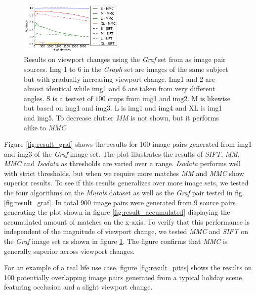 \documentclass[conference]{IEEEtran}
\begin{document}
\begin{figure}
	\centering
	\includegraphics[width=0.45\textwidth]{images/result_viewport}
	\caption{Results on viewport changes using the \emph{Graf} set from 
		\cite{mikolajczyk2005performance} as image pair sources. Img 1 
		to 6 in the \emph{Graph} set are images of the same subject but 
		with gradually increasing viewport change. Img1 and 2 are 
		almost identical while img1 and 6 are taken from very different 
		angles. S is a testset of $100$ crops from img1 and img2. M is 
	likewise but based on img1 and img3.  L is img1 and img4 and XL is 
img1 and img5.  To decrease clutter \emph{MM} is not shown, but it 
performs alike to \emph{MMC}}
	\label{fig:result_viewport}
\end{figure}

Figure \ref{fig:result_graf} shows the results for 100 image pairs 
generated from img1 and img3 of the \emph{Graf} image set. The plot 
illustrates the results of \emph{SIFT}, \emph{MM}, \emph{MMC} and 
\emph{Isodata} as thresholds are varied over a range. \emph{Isodata} 
performs well with strict thresholds, but when we require more matches 
\emph{MM} and \emph{MMC} show superior results. To see if this results 
generalizes over more image sets, we tested the four algorithms on the 
\emph{Murals} dataset as well as the \emph{Graf} pair tested in fig.  
\ref{fig:result_graf}. In total 900 image pairs were generated from 9 
source pairs generating the plot shown in figure 
\ref{fig:result_accumulated} displaying the accumulated amount of 
matches on the x-axis. To verify that this performance is independent of 
the magnitude of viewport change, we tested \emph{MMC} and \emph{SIFT} 
on the \emph{Graf} image set as shown in figure 
\ref{fig:result_viewport}. The figure confirms that \emph{MMC} is 
generally superior across viewport changes.

For an example of a real life use case, figure \ref{fig:result_pitts} 
shows the results on 100 potentially overlapping image pairs generated 
from a typical holiday scene featuring occlusion and a slight viewport 
change.
\end{document}
